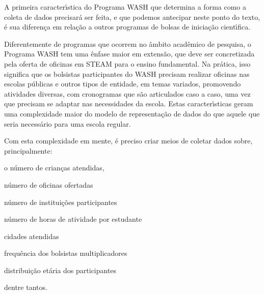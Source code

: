 \documentclass[
12pt,		%
openright,	%
twoside,  %
a4paper,			%
chapter=TITLE,		%
english,			%
french,				%
spanish,			%
brazil				%
]{USPSC-classe/USPSC}
\begin{document}
A primeira caracter\'{\i}stica do Programa WASH que determina a forma como a coleta de dados precisar\'a ser feita, e que podemos antecipar neste ponto do texto, \'e sua diferen\c{c}a em rela\c{c}\~ao a outros programas de bolsas de inicia\c{c}\~ao cient\'{\i}fica.









Diferentemente de programas que ocorrem no \^ambito acad\^emico de pesquisa, o Programa WASH tem uma \^enfase maior em extens\~ao, que deve ser concretizada pela oferta de oficinas em STEAM para o ensino fundamental. Na pr\'atica, isso significa que os bolsistas participantes do WASH precisam realizar oficinas nas escolas p\'ublicas e outros tipos de entidade, em temas variados, promovendo atividades diversas, com cronogramas que s\~ao articulados caso a caso, uma vez que precisam se adaptar nas necessidades da escola. Estas caracter\'{\i}sticas geram uma complexidade maior do modelo de representa\c{c}\~ao de dados do que aquele que seria necess\'ario para uma escola regular.









Com esta complexidade em mente, \'e preciso criar meios de coletar dados sobre, principalmente:










\begin{alineas}
\item o n\'umero de crian\c{c}as atendidas,
\item n\'umero de oficinas ofertadas
\item n\'umero de institui\c{c}\~oes participantes
\item n\'umero de horas de atividade por estudante
\item cidades atendidas
\item frequ\^encia dos bolsistas multiplicadores
\item distribui\c{c}\~ao et\'aria dos participantes
\end{alineas}

dentre tantos.
\end{document}
